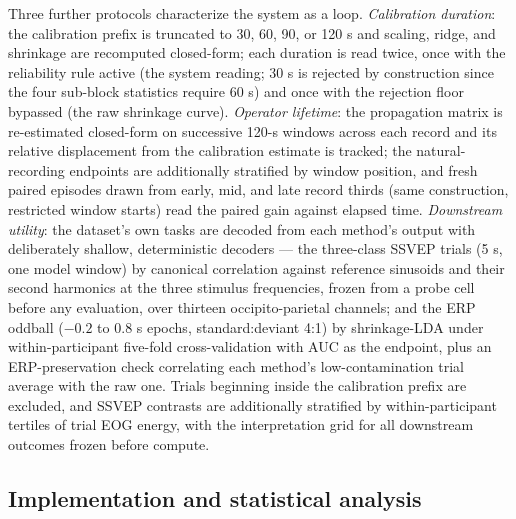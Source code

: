 Three further protocols characterize the system as a loop. \emph{Calibration duration}: the calibration prefix is truncated to 30, 60, 90, or 120 s and scaling, ridge, and shrinkage are recomputed closed-form; each duration is read twice, once with the reliability rule active (the system reading; 30 s is rejected by construction since the four sub-block statistics require 60 s) and once with the rejection floor bypassed (the raw shrinkage curve). \emph{Operator lifetime}: the propagation matrix is re-estimated closed-form on successive 120-s windows across each record and its relative displacement from the calibration estimate is tracked; the natural-recording endpoints are additionally stratified by window position, and fresh paired episodes drawn from early, mid, and late record thirds (same construction, restricted window starts) read the paired gain against elapsed time. \emph{Downstream utility}: the dataset's own tasks are decoded from each method's output with deliberately shallow, deterministic decoders --- the three-class SSVEP trials (5 s, one model window) by canonical correlation against reference sinusoids and their second harmonics at the three stimulus frequencies, frozen from a probe cell before any evaluation, over thirteen occipito-parietal channels; and the ERP oddball ($-0.2$ to $0.8$ s epochs, standard:deviant 4:1) by shrinkage-LDA under within-participant five-fold cross-validation with AUC as the endpoint, plus an ERP-preservation check correlating each method's low-contamination trial average with the raw one. Trials beginning inside the calibration prefix are excluded, and SSVEP contrasts are additionally stratified by within-participant tertiles of trial EOG energy, with the interpretation grid for all downstream outcomes frozen before compute.

\subsection{Implementation and statistical analysis}
\label{sec:exp-implementation}

